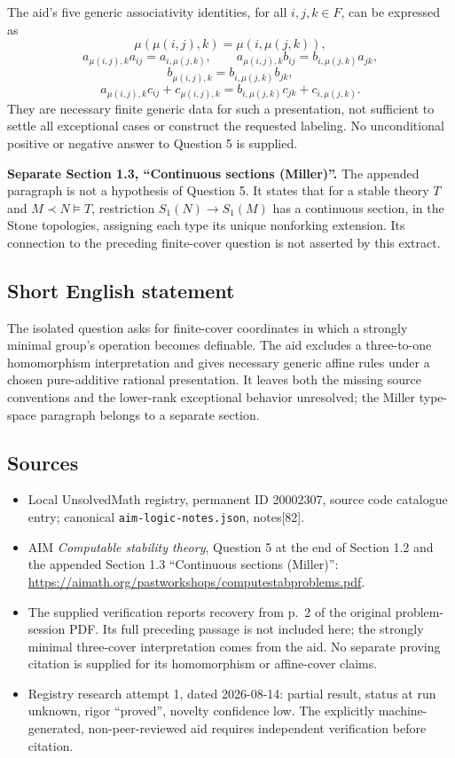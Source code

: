 \documentclass[11pt]{article}
\begin{document}
The aid's five generic associativity identities, for all $i,j,k\in F$, can be expressed as
\[
 \mu(\mu(i,j),k)=\mu(i,\mu(j,k)),
\]
\[
 a_{\mu(i,j),k}a_{ij}=a_{i,\mu(j,k)},\qquad
 a_{\mu(i,j),k}b_{ij}=b_{i,\mu(j,k)}a_{jk},
\]
\[
 b_{\mu(i,j),k}=b_{i,\mu(j,k)}b_{jk},
\]
\[
 a_{\mu(i,j),k}c_{ij}+c_{\mu(i,j),k}
       =b_{i,\mu(j,k)}c_{jk}+c_{i,\mu(j,k)}.
\]
They are necessary finite generic data for such a presentation, not sufficient to settle all exceptional cases or construct the requested labeling. No unconditional positive or negative answer to Question 5 is supplied.

\textbf{Separate Section 1.3, ``Continuous sections (Miller)''.} The appended paragraph is not a hypothesis of Question 5. It states that for a stable theory $T$ and $M\prec N\models T$, restriction $S_1(N)\to S_1(M)$ has a continuous section, in the Stone topologies, assigning each type its unique nonforking extension. Its connection to the preceding finite-cover question is not asserted by this extract.
\subsection{Short English statement}
The isolated question asks for finite-cover coordinates in which a strongly minimal group's operation becomes definable. The aid excludes a three-to-one homomorphism interpretation and gives necessary generic affine rules under a chosen pure-additive rational presentation. It leaves both the missing source conventions and the lower-rank exceptional behavior unresolved; the Miller type-space paragraph belongs to a separate section.
\subsection{Sources}
\begin{itemize}
\item Local UnsolvedMath registry, permanent ID 20002307, source code catalogue entry; canonical \texttt{aim-logic-notes.json}, notes[82].
\item AIM \emph{Computable stability theory}, Question 5 at the end of Section 1.2 and the appended Section 1.3 ``Continuous sections (Miller)'': \url{https://aimath.org/pastworkshops/computestabproblems.pdf}.
\item The supplied verification reports recovery from p.~2 of the original problem-session PDF. Its full preceding passage is not included here; the strongly minimal three-cover interpretation comes from the aid. No separate proving citation is supplied for its homomorphism or affine-cover claims.
\item Registry research attempt 1, dated 2026-08-14: partial result, status at run unknown, rigor ``proved'', novelty confidence low. The explicitly machine-generated, non-peer-reviewed aid requires independent verification before citation.
\end{itemize}
\end{document}

